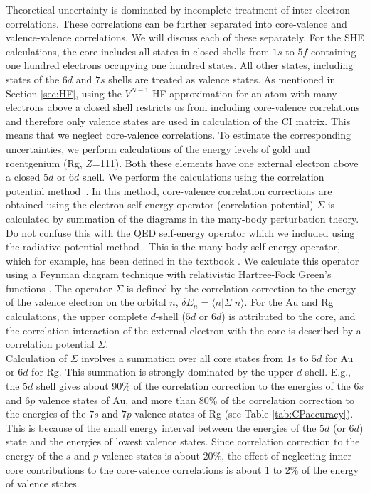 \documentclass[10pt,a4paper, twoside, openright]{report}
\begin{document}
Theoretical uncertainty is dominated by incomplete treatment of inter-electron correlations. These correlations can be further separated into core-valence and valence-valence correlations. We will discuss each of these separately. For the SHE calculations, the core includes all states in closed shells
from $1s$ to $5f$ containing one hundred electrons occupying one hundred states.
All other states, including states of the $6d$ and $7s$ shells are treated as
valence states. As mentioned in Section \ref{sec:HF}, using the $V^{N-1}$ HF approximation for an atom with many electrons above a closed shell restricts us from including core-valence correlations and therefore only valence states are used in calculation of the CI matrix.
This means that we neglect core-valence correlations. To estimate the corresponding uncertainties, we perform calculations of the energy levels of gold and roentgenium (Rg, $Z$=111). Both these elements have one external electron above a closed $5d$ or $6d$ shell. We perform the calculations using the correlation potential method~\cite{Dzuba1988, DFSS1987_2}. In this method, core-valence correlation corrections are obtained using the electron self-energy operator (correlation potential) $\Sigma$ is calculated by summation of the diagrams in the many-body perturbation theory. Do not confuse this with  the QED self-energy operator which we included using the radiative potential method \cite{FG2005}. This is the many-body self-energy operator, which for example, has been defined in the textbook \cite{LandauStatPhysPart2}. We calculate this operator using a Feynman diagram technique with relativistic Hartree-Fock Green's functions \cite{Dzuba1988}. The operator $\Sigma $ is defined by the correlation correction to the energy of the valence electron on the orbital $n$, $\delta E_n = \langle n | \Sigma | n \rangle$.   For the Au and Rg calculations, the upper complete $d$-shell ($5d$ or $6d$) is attributed to the core, and the correlation interaction of the external electron with the core is described by a correlation potential $\Sigma$.   \\

Calculation of $\Sigma$ involves a summation over all core states from
$1s$ to $5d$ for Au or $6d$ for Rg. This summation is strongly dominated by the upper $d$-shell. E.g., the $5d$ shell gives about 90\% of the correlation correction to the energies of the $6s$ and $6p$ valence states of Au, and more than 80\% of the correlation correction to the energies of the $7s$ and $7p$ valence states of Rg (see Table \ref{tab:CPaccuracy}). This is because of the small energy interval between the energies of
the $5d$ (or $6d$) state and the energies of lowest valence states.  Since correlation correction to the energy of the $s$ and $p$ valence states is about 20\%, the effect of neglecting inner-core contributions to the core-valence correlations is about 1 to 2\% of the energy of valence states.
\end{document}
